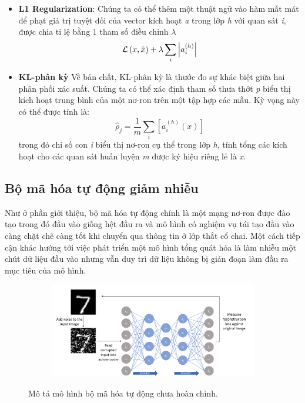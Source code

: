 \begin{itemize}[leftmargin=1.5cm]
    \item \textbf{L1 Regularization}: Chúng ta có thể thêm một thuật ngữ vào hàm mất mát
          để phạt giá trị tuyệt đối của vector kích hoạt \textit{a} trong lớp \textit{h} với quan sát \textit{i}, được chia tỉ lệ
          bằng 1 tham số điều chỉnh \textit{$\lambda$}
          \begin{equation}
              {\cal L}\left( {x,\hat x} \right) +  \lambda \sum\limits_i {\left| {a_i^{\left( h \right)}} \right|}
          \end{equation}
    \item \textbf{KL-phân kỳ} Về bản chất, KL-phân kỳ là thước đo sự
          khác biệt giữa hai phân phối xác suất. Chúng ta có thể xác định
          tham số thưa thớt \textit{p} biểu thị kích hoạt trung bình của
          một nơ-ron trên một tập hợp các mẫu. Kỳ vọng này có thể được tính là:
          \begin{equation}
              {{\hat \rho }_ j} = \frac{1}{m}\sum\limits_{i} {\left[ {a_i^{\left( h \right)}\left( x \right)} \right]}
          \end{equation}
          trong đó chỉ số con \textit{i} biểu thị nơ-ron cụ thể trong lớp \textit{h}, tính tổng các kích hoạt
          cho các quan sát huấn luyện \textit{m} được ký hiệu riêng lẻ là \textit{x}.

\end{itemize}

\subsection{Bộ mã hóa tự động giảm nhiễu}

Như ở phần giới thiệu, bộ mã hóa tự động chính là một mạng
nơ-ron được đào tạo
trong đó đầu vào giống hệt đầu ra và mô hình có nghiệm vụ tái
tạo đầu vào càng
chặt chẽ càng tốt khi chuyển qua thông tin ở lớp thắt cổ chai.
Một cách tiếp cận khác hướng tới việc phát triển một mô hình
tổng quát hóa là làm nhiễu một chút dữ liệu đầu vào nhưng vẫn
duy trì dữ liệu không bị gián đoạn làm đầu ra mục tiêu của mô hình.

\begin{figure}
    \begin{subfigure}{0.8\textwidth}
        \includegraphics[width=1.\linewidth]{Chapters/items/auto5.jpg}
        \caption{}
        \label{fig: auto5}
    \end{subfigure}
    \caption{Mô tả mô hình bộ mã hóa tự động chưa hoàn chỉnh.}
\end{figure}

